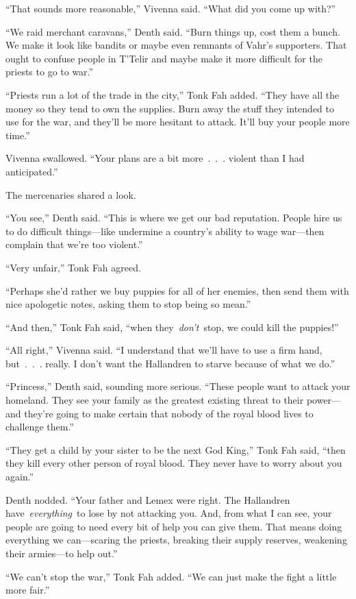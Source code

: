 “That sounds more reasonable,” Vivenna said. “What did you come up with?”

“We raid merchant caravans,” Denth said. “Burn things up, cost them a bunch. We make it look like bandits or maybe even remnants of Vahr’s supporters. That ought to confuse people in T’Telir and maybe make it more difficult for the priests to go to war.”

“Priests run a lot of the trade in the city,” Tonk Fah added. “They have all the money so they tend to own the supplies. Burn away the stuff they intended to use for the war, and they’ll be more hesitant to attack. It’ll buy your people more time.”

Vivenna swallowed. “Your plans are a bit more~.~.~. violent than I had anticipated.”

The mercenaries shared a look.

“You see,” Denth said. “This is where we get our bad reputation. People hire us to do difficult things—like undermine a country’s ability to wage war—then complain that we’re too violent.”

“Very unfair,” Tonk Fah agreed.

“Perhaps she’d rather we buy puppies for all of her enemies, then send them with nice apologetic notes, asking them to stop being so mean.”

“And then,” Tonk Fah said, “when they~\textit{don’t}~stop, we could kill the puppies!”

“All right,” Vivenna said. “I understand that we’ll have to use a firm hand, but~.~.~. really. I don’t want the Hallandren to starve because of what we do.”

“Princess,” Denth said, sounding more serious. “These people want to attack your homeland. They see your family as the greatest existing threat to their power—and they’re going to make certain that nobody of the royal blood lives to challenge them.”

“They get a child by your sister to be the next God King,” Tonk Fah said, “then they kill every other person of royal blood. They never have to worry about you again.”

Denth nodded. “Your father and Lemex were right. The Hallandren have~\textit{everything}~to lose by not attacking you. And, from what I can see, your people are going to need every bit of help you can give them. That means doing everything we can—scaring the priests, breaking their supply reserves, weakening their armies—to help out.”

“We can’t stop the war,” Tonk Fah added. “We can just make the fight a little more fair.”

